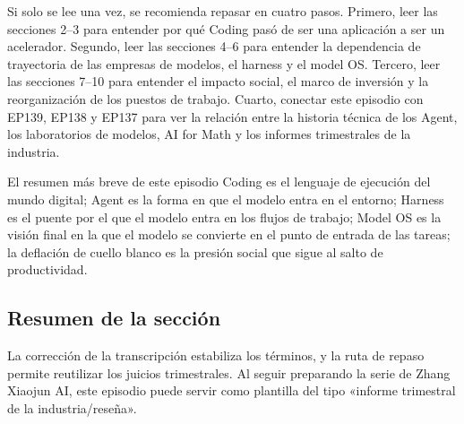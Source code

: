 Si solo se lee una vez, se recomienda repasar en cuatro pasos. Primero, leer las secciones 2--3 para entender por qué Coding pasó de ser una aplicación a ser un acelerador. Segundo, leer las secciones 4--6 para entender la dependencia de trayectoria de las empresas de modelos, el harness y el model OS. Tercero, leer las secciones 7--10 para entender el impacto social, el marco de inversión y la reorganización de los puestos de trabajo. Cuarto, conectar este episodio con EP139, EP138 y EP137 para ver la relación entre la historia técnica de los Agent, los laboratorios de modelos, AI for Math y los informes trimestrales de la industria.

\begin{knowledgebox}{El resumen más breve de este episodio}
Coding es el lenguaje de ejecución del mundo digital; Agent es la forma en que el modelo entra en el entorno; Harness es el puente por el que el modelo entra en los flujos de trabajo; Model OS es la visión final en la que el modelo se convierte en el punto de entrada de las tareas; la deflación de cuello blanco es la presión social que sigue al salto de productividad.
\end{knowledgebox}

\subsection{Resumen de la sección}

La corrección de la transcripción estabiliza los términos, y la ruta de repaso permite reutilizar los juicios trimestrales. Al seguir preparando la serie de Zhang Xiaojun AI, este episodio puede servir como plantilla del tipo «informe trimestral de la industria/reseña».
